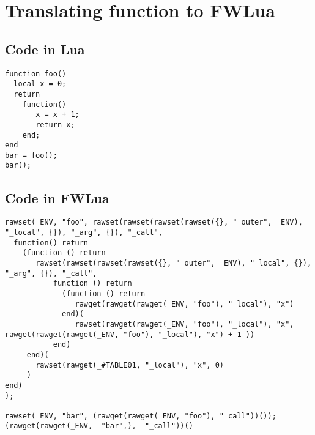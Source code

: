 \chapter{Translating function to FWLua\label{app:function}}

\section{Code in Lua}

\begin{verbatim}
function foo()
  local x = 0;
  return 
    function() 
       x = x + 1;
       return x; 
    end;
end
bar = foo();
bar();
\end{verbatim}

\section{Code in FWLua}

\begin{verbatim}
rawset(_ENV, "foo", rawset(rawset(rawset(rawset({}, "_outer", _ENV), "_local", {}), "_arg", {}), "_call",
  function() return
    (function () return
       rawset(rawset(rawset(rawset({}, "_outer", _ENV), "_local", {}), "_arg", {}), "_call",
           function () return
             (function () return
                rawget(rawget(rawget(_ENV, "foo"), "_local"), "x")
             end)(
                rawset(rawget(rawget(_ENV, "foo"), "_local"), "x",   rawget(rawget(rawget(_ENV, "foo"), "_local"), "x") + 1 ))
           end)
     end)(
       rawset(rawget(_#TABLE01, "_local"), "x", 0)
     )
end)
);

rawset(_ENV, "bar", (rawget(rawget(_ENV, "foo"), "_call"))());
(rawget(rawget(_ENV,  "bar",),  "_call"))()
\end{verbatim}
